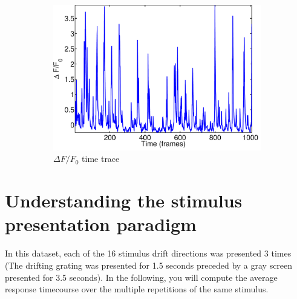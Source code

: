 \documentclass[paper=a4, fontsize=11pt]{article} %
\numberwithin{equation}{section} %
\numberwithin{figure}{section} %
\numberwithin{table}{section} %
\begin{document}
\begin{figure}
\begin{subfigure}[b]{0.3\textwidth}
    \includegraphics[width=\textwidth]{trace_delta_f_f0.pdf}
    \caption{$\Delta F/F_0$ time trace}
    \label{fig:time_trace_dff0}
    \end{subfigure}
    
    \caption{}
\end{figure}


\section{Understanding the stimulus presentation paradigm}

In this dataset, each of the 16 stimulus drift directions was presented 3 times (The drifting grating was presented for 1.5 seconds preceded by a gray screen presented for 3.5 seconds).
In the following, you will compute the average response timecourse over the multiple repetitions of the same stimulus.
\end{document}

